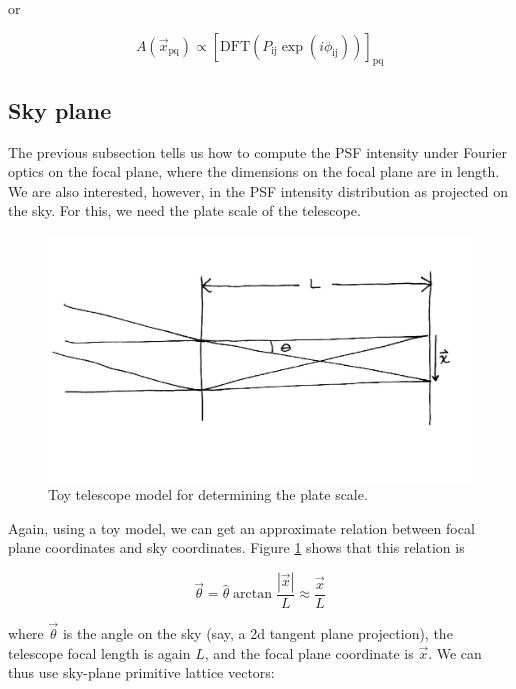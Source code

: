 \documentclass{article}
\begin{document}
or

\begin{equation}
    A(\vec{x}_{\mathrm{pq}}) \propto
        \left[\mathrm{DFT}\left(P_{\mathrm{ij}} \exp\left(i \phi_{\mathrm{ij}} \right) \right)\right]_{\mathrm{pq}}
    \label{eqn:fftpsf}
\end{equation}

\subsection{Sky plane}

The previous subsection tells us how to compute the PSF intensity under Fourier optics on the focal
plane, where the dimensions on the focal plane are in length.  We are also interested, however, in
the PSF intensity distribution as projected on the sky.  For this, we need the plate scale of the
telescope.

\begin{figure}
    \includegraphics{PlateScale.png}
    \caption{Toy telescope model for determining the plate scale.}
    \label{fig:PlateScale}
\end{figure}

Again, using a toy model, we can get an approximate relation between focal plane coordinates and sky
coordinates.  Figure \ref{fig:PlateScale} shows that this relation is

\begin{equation}
    \vec{\theta} = \hat{\theta} \arctan \frac{|\vec{x}|}{L} \approx \frac{\vec{x}}{L}
\end{equation}

where $\vec{\theta}$ is the angle on the sky (say, a 2d tangent plane projection),  the telescope
focal length is again $L$, and the focal plane coordinate is $\vec{x}$.  We can thus use sky-plane
primitive lattice vectors:
\end{document}
